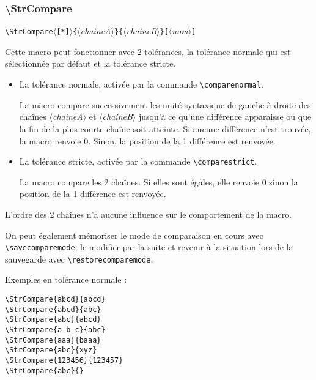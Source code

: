 \documentclass[a4paper,10pt]{article}
\newcommand\guill[1]{\og{}#1\fg{}}
\newcommand\argu[1]{$\langle$\textit{#1}$\rangle$}
\newcommand\ARGU[1]{\texttt{\color{black}\{}\argu{#1}\texttt{\color{black}\}}}
\newcommand\arguC[1]{\texttt{\color{black}[}\argu{#1}\texttt{\color{black}]}}
\newcommand\etoile{$\langle$\texttt{[*]}$\rangle$}
\newcommand\US{unité syntaxique\xspace}
\newcommand\styleexemple{\small\vskip4pt}
\newcommand\verbinline{\lstinline[basicstyle=\normalsize\ttfamily]}
\begin{document}
\subsubsection{\ttfamily\textbackslash StrCompare}
\verbinline|\StrCompare|\etoile\ARGU{chaineA}\ARGU{chaineB}\arguC{nom}
\smallskip

Cette macro peut fonctionner avec 2 tolérances, la tolérance \guill{normale} qui est sélectionnée par défaut et la tolérance \guill{stricte}.\medskip

\begin{itemize}
	\item La tolérance normale, activée par la commande \verbinline|\comparenormal|.\par
	La macro compare successivement les \US de gauche à droite des chaînes \argu{chaineA} et \argu{chaineB} jusqu'à ce qu'une différence apparaisse ou que la fin de la plus courte chaîne soit atteinte. Si aucune différence n'est trouvée, la macro renvoie 0. Sinon, la position de la 1\iere{} différence est renvoyée.
	\item La tolérance stricte, activée par la commande \verbinline|\comparestrict|.\par
	La macro compare les 2 chaînes. Si elles sont égales, elle renvoie 0 sinon la position de la 1\iere{} différence est renvoyée.
\end{itemize}
\smallskip

L'ordre des 2 chaînes n'a aucune influence sur le comportement de la macro.

\medskip On peut également mémoriser le mode de comparaison en cours avec \verbinline|\savecomparemode|, le modifier par la suite et revenir à la situation lors de la sauvegarde avec \verbinline|\restorecomparemode|.\medskip

Exemples en tolérance normale :\par\nobreak
\begin{minipage}[t]{0.65\linewidth}
\comparenormal
\begin{lstlisting}
\StrCompare{abcd}{abcd}
\StrCompare{abcd}{abc}
\StrCompare{abc}{abcd}
\StrCompare{a b c}{abc}
\StrCompare{aaa}{baaa}
\StrCompare{abc}{xyz}
\StrCompare{123456}{123457}
\StrCompare{abc}{}
\end{lstlisting}%
\end{minipage}\hfill
\begin{minipage}[t]{0.35\linewidth}
	\styleexemple
	\comparenormal
	\par
	\par
	\par
	\par
	\par
	\par
	\par
\end{minipage}%
\medskip
\end{document}
